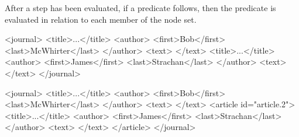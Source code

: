 \documentclass[20pt,landscape,headrule,footrule]{foils}
\begin{document}

After a step has been evaluated, if a predicate follows, then the
predicate is evaluated in relation to each member of the node set.




\begin{codelisting}
<journal>
        <title>...</title>
        <author>
          <first>Bob</first>
          <last>McWhirter</last>
        </author>
        <text>
        </text>
        <title>...</title>
        <author>
          <first>James</first>
          <last>Strachan</last>
        </author>
        <text>
        </text>
</journal>
\end{codelisting}




\begin{codelisting}
<journal>
        <title>...</title>
        <author>
          <first>Bob</first>
          <last>McWhirter</last>
        </author>
        <text>
        </text>
    <article id="article.2">
        <title>...</title>
        <author>
          <first>James</first>
          <last>Strachan</last>
        </author>
        <text>
        </text>
    </article>
</journal>
\end{codelisting}



\end{document}
